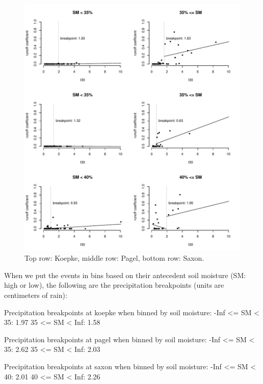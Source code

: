 \documentclass[12pt]{article}
\begin{document}
\begin{figure}
    \begin{center}
\includegraphics{runoff-I30_binned2}
    \end{center}
    \caption{Top row: Koepke, middle row: Pagel, bottom row: Saxon.\label{I30_binned2}}
\end{figure}


When we put the events in bins based on their antecedent soil moisture (SM: high or low), the following are the precipitation breakpoints (units are centimeters of rain):\\

\begin{Schunk}
\begin{Soutput}
Precipitation breakpoints at koepke when binned by soil moisture:
-Inf <= SM < 35: 1.97
35 <= SM < Inf: 1.58

Precipitation breakpoints at pagel when binned by soil moisture:
-Inf <= SM < 35: 2.62
35 <= SM < Inf: 2.03

Precipitation breakpoints at saxon when binned by soil moisture:
-Inf <= SM < 40: 2.01
40 <= SM < Inf: 2.26
\end{Soutput}
\end{Schunk}
\end{document}
